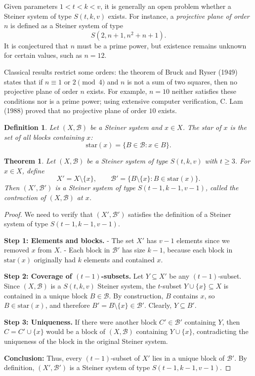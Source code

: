 \documentclass[12pt,a4paper,openany]{book}
\newtheorem{theorem}{Theorem}[section]
\newtheorem{definition}{Definition}[section]
\begin{document}
Given parameters $1 < t < k < v$, it is generally an open problem whether a Steiner system of type $S(t, k, v)$ exists.  
For instance, a \emph{projective plane of order $n$} is defined as a Steiner system of type 
\[
S(2, n+1, n^2+n+1).
\] 
It is conjectured that $n$ must be a prime power, but existence remains unknown for certain values, such as $n = 12$.  

Classical results restrict some orders: the theorem of Bruck and Ryser (1949) states that if $n \equiv 1$ or $2 \pmod{4}$ and $n$ is not a sum of two squares, then no projective plane of order $n$ exists.  
For example, $n = 10$ neither satisfies these conditions nor is a prime power; using extensive computer verification, C. Lam (1988) proved that no projective plane of order $10$ exists.

\begin{definition}
Let $(X, \mathscr{B})$ be a Steiner system and $x \in X$.  
The \emph{star} of $x$ is the set of all blocks containing $x$:
\[
\mathrm{star}(x) = \{B \in \mathscr{B} : x \in B\}.
\]
\end{definition}


\begin{theorem}\label{thm:contraction}
Let $(X, \mathscr{B})$ be a Steiner system of type $S(t, k, v)$ with $t \ge 3$.  
For $x \in X$, define 
\[
X' = X \setminus \{x\}, \qquad 
\mathscr{B}' = \{B \setminus \{x\} : B \in \mathrm{star}(x)\}.
\] 
Then $(X', \mathscr{B}')$ is a Steiner system of type $S(t-1, k-1, v-1)$, called the \emph{contraction} of $(X, \mathscr{B})$ at $x$.
\end{theorem}

\begin{proof}
We need to verify that $(X', \mathscr{B}')$ satisfies the definition of a Steiner system of type $S(t-1, k-1, v-1)$.  

\textbf{Step 1: Elements and blocks.}  
- The set $X'$ has $v-1$ elements since we removed $x$ from $X$.  
- Each block in $\mathscr{B}'$ has size $k-1$, because each block in $\mathrm{star}(x)$ originally had $k$ elements and contained $x$.  

\textbf{Step 2: Coverage of $(t-1)$-subsets.}  
Let $Y \subseteq X'$ be any $(t-1)$-subset. Since $(X, \mathscr{B})$ is a $S(t,k,v)$ Steiner system, the $t$-subset $Y \cup \{x\} \subseteq X$ is contained in a unique block $B \in \mathscr{B}$.  
By construction, $B$ contains $x$, so $B \in \mathrm{star}(x)$, and therefore $B' = B \setminus \{x\} \in \mathscr{B}'$.  
Clearly, $Y \subseteq B'$.  

\textbf{Step 3: Uniqueness.}  
If there were another block $C' \in \mathscr{B}'$ containing $Y$, then $C = C' \cup \{x\}$ would be a block of $(X, \mathscr{B})$ containing $Y \cup \{x\}$, contradicting the uniqueness of the block in the original Steiner system.  

\textbf{Conclusion:}  
Thus, every $(t-1)$-subset of $X'$ lies in a unique block of $\mathscr{B}'$. By definition, $(X', \mathscr{B}')$ is a Steiner system of type $S(t-1, k-1, v-1)$.
\end{proof}
\end{document}
